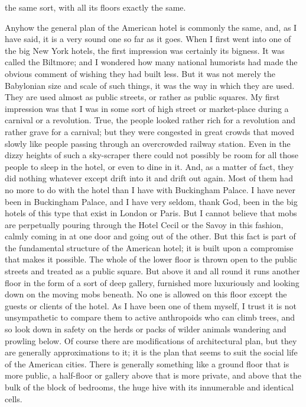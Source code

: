 \documentclass{book}
\begin{document}
the same sort, with all its floors exactly the same.

Anyhow the general plan of the American hotel is commonly the same, and, as I have said, it is a very sound one so far as it goes. When I first went into one of the big New York hotels, the first impression was certainly its bigness. It was called the Biltmore; and I wondered how many national humorists had made the obvious comment of wishing they had built less. But it was not merely the Babylonian size and scale of such things, it was the way in which they are used. They are used almost as public streets, or rather as public squares. My first impression was that I was in some sort of high street or market-place during a carnival or a revolution. True, the people looked rather rich for a revolution and rather grave for a carnival; but they were congested in great crowds that moved slowly like people passing through an overcrowded railway station. Even in the dizzy heights of such a sky-scraper there could not possibly be room for all those people to sleep in the hotel, or even to dine in it. And, as a matter of fact, they did nothing whatever except drift into it and drift out again. Most of them had no more to do with the hotel than I have with Buckingham Palace. I have never been in Buckingham Palace, and I have very seldom, thank God, been in the big hotels of this type that exist in London or Paris. But I cannot believe that mobs are perpetually pouring through the Hotel Cecil or the Savoy in this fashion, calmly coming in at one door and going out of the other. But this fact is part of the fundamental structure of the American hotel; it is built upon a compromise that makes it possible. The whole of the lower floor is thrown open to the public streets and treated as a public square. But above it and all round it runs another floor in the form of a sort of deep gallery, furnished more luxuriously and looking down on the moving mobs beneath. No one is allowed on this floor except the guests or clients of the hotel. As I have been one of them myself, I trust it is not unsympathetic to compare them to active anthropoids who can climb trees, and so look down in safety on the herds or packs of wilder animals wandering and prowling below. Of course there are modifications of architectural plan, but they are generally approximations to it; it is the plan that seems to suit the social life of the American cities. There is generally something like a ground floor that is more public, a half-floor or gallery above that is more private, and above that the bulk of the block of bedrooms, the huge hive with its innumerable and identical cells.
\end{document}
